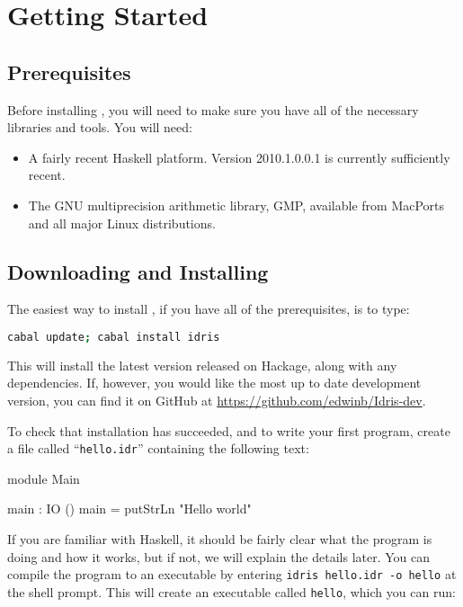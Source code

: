 \section{Getting Started}

\subsection{Prerequisites} 

Before installing \Idris{}, you will need to make sure you have all of the necessary libraries and tools.
You will need:

\begin{itemize}
\item A fairly recent Haskell platform. Version 2010.1.0.0.1 is currently sufficiently recent.
\item The GNU multiprecision arithmetic library, GMP, available from MacPorts and all major Linux distributions.
\end{itemize}

\subsection{Downloading and Installing}

The easiest way to install \Idris{}, if you have all of the prerequisites, is to type:

\begin{lstlisting}[language=bash]
cabal update; cabal install idris
\end{lstlisting}

\noindent
This will install the latest version released on Hackage, along with any dependencies. 
If, however, you would like the most up to date development version, you can find it on GitHub at \url{https://github.com/edwinb/Idris-dev}.

To check that installation has succeeded, and to write your first \Idris{} program, create a file called ``\texttt{hello.idr}'' containing the following text:

\begin{code}
module Main

main : IO ()
main = putStrLn "Hello world"
\end{code}

\noindent
If you are familiar with Haskell, it should be fairly clear what the program is doing and how it works, but if not, we will explain the details later.
You can compile the program to an executable by entering \texttt{idris hello.idr -o hello} at the shell prompt. 
This will create an executable called \texttt{hello}, which you can run:

